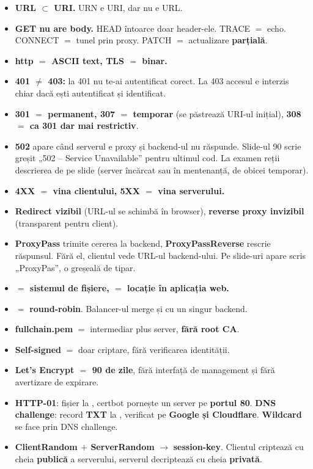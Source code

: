 \documentclass[11pt,a4paper]{article}
\begin{document}
\begin{capcana}
\begin{itemize}
  \item \textbf{URL $\subset$ URI.} URN e URI, dar nu e URL.
  \item \textbf{GET nu are body.} HEAD întoarce doar header-ele. TRACE $=$ echo. CONNECT $=$ tunel prin proxy. PATCH $=$ actualizare \textbf{parțială}.
  \item \textbf{http $=$ ASCII text, TLS $=$ binar.}
  \item \textbf{401 $\neq$ 403:} la 401 nu te-ai autentificat corect. La 403 accesul e interzis chiar dacă ești autentificat și identificat.
  \item \textbf{301 $=$ permanent, 307 $=$ temporar} (se păstrează URI-ul inițial), \textbf{308 $=$ ca 301 dar mai restrictiv}.
  \item \textbf{502} apare când serverul e proxy și backend-ul nu răspunde. Slide-ul 90 scrie greșit „502 -- Service Unavailable” pentru ultimul cod. La examen reții descrierea de pe slide (server încărcat sau în mentenanță, de obicei temporar).
  \item \textbf{4XX $=$ vina clientului, 5XX $=$ vina serverului.}
  \item \textbf{Redirect vizibil} (URL-ul se schimbă în browser), \textbf{reverse proxy invizibil} (transparent pentru client).
  \item \textbf{ProxyPass} trimite cererea la backend, \textbf{ProxyPassReverse} rescrie răspunsul. Fără el, clientul vede URL-ul backend-ului. Pe slide-uri apare scris „ProxyPas”, o greșeală de tipar.
  \item \textbf{ $=$ sistemul de fișiere,  $=$ locație în aplicația web.}
  \item {} $=$ \textbf{round-robin}. Balancer-ul merge și cu un singur backend.
  \item \textbf{fullchain.pem} $=$ intermediar plus server, \textbf{fără root CA}.
  \item \textbf{Self-signed} $=$ doar criptare, fără verificarea identității.
  \item \textbf{Let's Encrypt $=$ 90 de zile}, fără interfață de management și fără avertizare de expirare.
  \item \textbf{HTTP-01}: fișier la , certbot pornește un server pe \textbf{portul 80}. \textbf{DNS challenge}: record \textbf{TXT} la , verificat pe \textbf{Google și Cloudflare}. \textbf{Wildcard} se face prin DNS challenge.
  \item \textbf{ClientRandom $+$ ServerRandom} $\rightarrow$ \textbf{session-key}. Clientul criptează cu cheia \textbf{publică} a serverului, serverul decriptează cu cheia \textbf{privată}.
\end{itemize}
\end{capcana}
\end{document}
